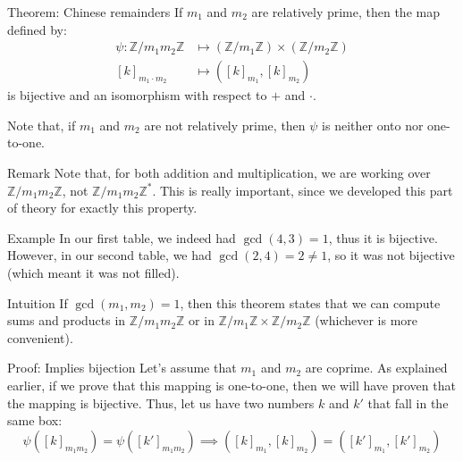 \documentclass[a4paper]{article}
\begin{document}
\begin{parag}{Theorem: Chinese remainders}
    If $m_1$ and $m_2$ are relatively prime, then the map defined by:
    \[\begin{split}
        \psi: \mathbb{Z} / m_1 m_2 \mathbb{Z} &\longmapsto \left(\mathbb{Z} / m_1 \mathbb{Z}\right) \times \left(\mathbb{Z} / m_2\mathbb{Z}\right) \\
        \left[k\right]_{m_1 \cdot m_2} &\longmapsto \left(\left[k\right]_{m_1}, \left[k\right]_{m_2}\right)
    \end{split}\]
    is bijective and an isomorphism with respect to $+$ and $\cdot$.

    Note that, if $m_1$ and $m_2$ are not relatively prime, then $\psi$ is neither onto nor one-to-one.

    \begin{subparag}{Remark}
        Note that, for both addition and multiplication, we are working over $\mathbb{Z} / m_1 m_2 \mathbb{Z}$, not $\mathbb{Z} / m_1 m_2 \mathbb{Z}^*$. This is really important, since we developed this part of theory for exactly this property.
    \end{subparag}

    \begin{subparag}{Example}
        In our first table, we indeed had $\gcd\left(4, 3\right) = 1$, thus it is bijective. However, in our second table, we had $\gcd\left(2, 4\right) = 2 \neq 1$, so it was not bijective (which meant it was not filled).
    \end{subparag}

    \begin{subparag}{Intuition}
        If $\gcd\left(m_1, m_2\right) = 1$, then this theorem states that we can compute sums and products in $\mathbb{Z} / m_1 m_2 \mathbb{Z}$ or in $\mathbb{Z} / m_1 \mathbb{Z} \times \mathbb{Z} / m_2 \mathbb{Z}$ (whichever is more convenient).
    \end{subparag}

    \begin{subparag}{Proof: Implies bijection}
        Let's assume that $m_1$ and $m_2$ are coprime. As explained earlier, if we prove that this mapping is one-to-one, then we will have proven that the mapping is bijective. Thus, let us have two numbers $k$ and $k'$ that fall in the same box:
        \[\psi\left(\left[k\right]_{m_1 m_2}\right) = \psi\left(\left[k'\right]_{m_1 m_2}\right) \implies \left(\left[k\right]_{m_1}, \left[k\right]_{m_2}\right) = \left(\left[k'\right]_{m_1}, \left[k'\right]_{m_2}\right)\]


\end{subparag}
\end{parag}
\end{document}
